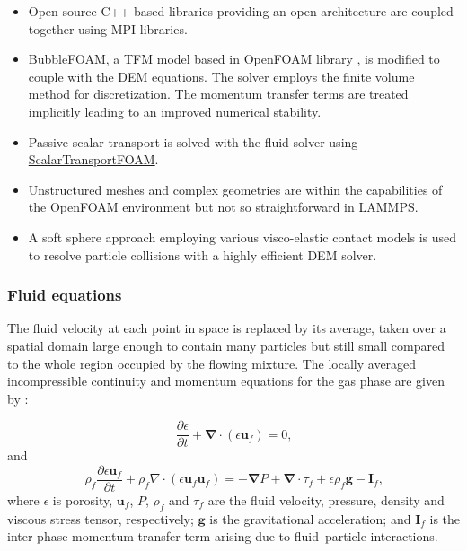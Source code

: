\documentclass[11pt,a4paper,openright]{article}
\begin{document}
\begin{itemize}
\item Open-source C++ based libraries providing an open architecture are coupled together using MPI libraries. 

\item BubbleFOAM, a TFM model based in OpenFOAM library \citep{rusche2003computational}, is modified to couple with the DEM equations. The solver employs the finite volume method for discretization. The momentum transfer terms are treated implicitly leading to an improved numerical stability. 

\item Passive scalar transport is solved with the fluid solver using \href{https://openfoamwiki.net/index.php/ScalarTransportFoam}{ScalarTransportFOAM}.

\item Unstructured meshes and complex geometries are within the capabilities of the OpenFOAM environment but not so straightforward in LAMMPS.

\item A soft sphere approach employing various visco-elastic contact models is used to resolve particle collisions with a highly efficient DEM solver.

\end{itemize}

\subsubsection{Fluid equations}
\label{sec:Fluid Equation}

The fluid velocity at each point in space is replaced by its average, taken over a spatial domain large enough to contain many particles but still small compared to the whole region occupied by the flowing mixture. The locally averaged incompressible continuity and momentum equations for the gas phase are given by \citep{anderson1967fluid, jackson1997locally}:

\begin{equation}
\label{eq:FluidContinuity}
\frac{\partial \epsilon} {\partial t} + \boldsymbol{\nabla} \cdot (\epsilon \mathbf{u}_{f}) =0 \text{,}
\end{equation}
and 
\begin{equation}
\label{eq:FluidMomentum}
\rho _{f} \frac{\partial \epsilon \mathbf{u}_{f}}{\partial t} +  \rho _{f} \nabla \cdot (\epsilon \mathbf{u}_{f} \mathbf{u}_{f})= - \boldsymbol{\nabla} P + \boldsymbol{\nabla} \cdot \tau _{f}+\epsilon\rho_{f}\mathbf{g} - \mathbf{I}_{f} \text{,}
\end{equation}
where $ \epsilon$ is porosity, $\mathbf{u}_{f}$, $P$, $ \rho_{f} $ and $\tau_{f} $ are the fluid velocity, pressure, density and viscous stress tensor, respectively; $\mathbf{g}$ is the gravitational acceleration;  and $\mathbf{I}_{f}$ is the inter-phase momentum transfer term arising due to fluid--particle interactions. 
\end{document}
